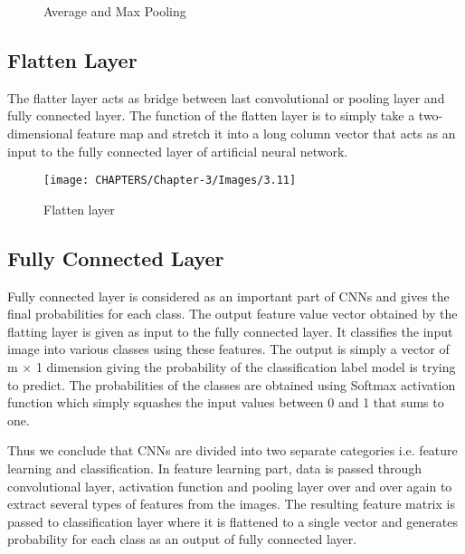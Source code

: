 \begin{figure}%
    \centering
    \qquad
    \caption{Average and Max Pooling}%
    \label{fig:3.10}%
\end{figure}

\subsection{Flatten Layer}

The flatter layer acts as bridge between last convolutional or pooling layer 
and fully connected layer. The function of the flatten layer is to simply take
a two-dimensional feature map and stretch it into a long column vector that acts as 
an input to the fully connected layer of artificial neural network.


\begin{figure}[H]
	\centering
		\texttt{[image: CHAPTERS/Chapter-3/Images/3.11]}
	\caption{Flatten layer}
	\label{fig:3.11}
\end{figure}


\subsection{Fully Connected Layer} 

Fully connected layer is considered as an important 
part of CNNs and gives the final 
probabilities for each class.  The output feature value vector obtained by the flatting layer is 
given as input to the fully connected layer. It classifies the input image into various classes using these features. The output is simply a vector 
of m $\times$ 1 dimension giving the probability of the 
classification label model is trying to predict. The probabilities of the
classes are obtained using Softmax activation function which simply squashes the input values between 0 and 1 that sums to one.

Thus we conclude that CNNs are divided into two separate categories i.e. feature learning and classification. In feature learning part,
 data is passed through convolutional layer, activation function and pooling layer over and over again to extract several types
of features from the images. The resulting feature matrix is passed to classification
layer where it is flattened to a single vector and generates probability for each class as an output of fully connected layer.